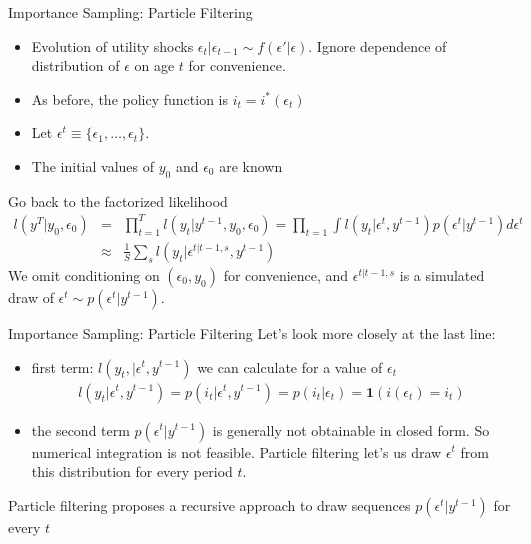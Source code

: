 \documentclass[xcolor=pdftex,dvipsnames,table,mathserif,aspectratio=169]{beamer}
\begin{document}
\begin{frame}{Importance Sampling: Particle Filtering}
\begin{itemize}
\item Evolution of utility shocks $\epsilon_t | \epsilon_{t-1} \sim f(\epsilon' | \epsilon)$. Ignore dependence of distribution of $\epsilon$ on age $t$ for convenience.
\item As before, the policy function is $i_t = i^{*}(\epsilon_t)$
\item Let $\epsilon^t \equiv \{\epsilon_1,\ldots,\epsilon_t\}$.
\item The initial values of $y_0$ and $\epsilon_0$ are known
\end{itemize}
Go back to the factorized likelihood
\begin{eqnarray*}
l(y^T | y_0,\epsilon_0 ) &=& \prod_{t=1}^T l (y_t | y^{t-1},y_0,\epsilon_0) = \prod_{t=1} \int l (y_t |\epsilon^t, y^{t-1}) p(\epsilon^t | y^{t-1} )d \epsilon^t  \\
&\approx& \frac{1}{S} \sum_s l(y_t | \epsilon^{t | t-1,s},y^{t-1})
\end{eqnarray*}
We omit conditioning on $(\epsilon_0, y_0)$ for convenience, and $\epsilon^{t | t-1,s}$ is a simulated draw of $\epsilon^t \sim p(\epsilon^t | y^{t-1})$.
\end{frame}



\begin{frame}{Importance Sampling: Particle Filtering}
Let's look more closely at the last line:
\begin{itemize}
\item first term: $l(y_t, | \epsilon^t,y^{t-1})$ we can calculate for a value of $\epsilon_t$
\begin{eqnarray*}
l(y_t | \epsilon^t , y^{t-1}) = p(i_t | \epsilon^t, y^{t-1}) = p(i_t | \epsilon_t) = \mathbf{1}(i(\epsilon_t) = i_t)
\end{eqnarray*}
\item the second term $p(\epsilon^t | y^{t-1})$ is generally not obtainable in closed form. So numerical integration is not feasible. Particle filtering let's us draw $\epsilon^t$ from this distribution for every period $t$.
\end{itemize}
Particle filtering proposes a recursive approach to draw sequences $p(\epsilon^t | y^{t-1})$ for every $t$
\end{frame}
\end{document}
